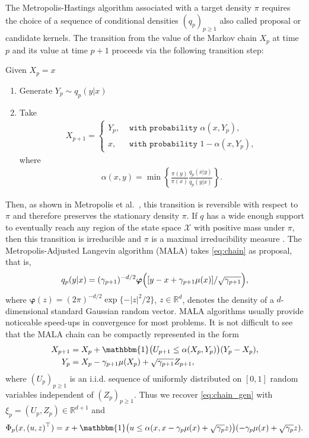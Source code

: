 \documentclass[article]{elsarticle}
\begin{document}
\begin{example}
The Metropolis-Hastings algorithm
associated with a target density \(\pi\) requires the choice of a sequence of conditional densities  \((q_p)_{p\geq 1}\) also called proposal or candidate kernels. The transition from the value  of the Markov chain \(X_p\)  at time \(p\)
and its value at time \(p + 1\) proceeds via the following transition step:

\begin{algorithm}[H]
Given \(X_p=x\)\;
\begin{enumerate}
\item Generate \(Y_p\sim q_p(y|x)\)\;
\item Take
\begin{eqnarray*}
X_{p+1}=
\begin{cases}
Y_p, & \texttt{ with probability } \alpha(x,Y_p),
\\
x, &  \texttt{ with probability } 1-\alpha(x,Y_p),
\end{cases}
\end{eqnarray*}
where
\begin{eqnarray*}
\alpha(x,y)=\min\left\{\frac{\pi(y)}{\pi(x)}\frac{q_p(x|y)}{q_p(y|x)}\right\}.
\end{eqnarray*}
\end{enumerate}
\end{algorithm}
Then, as shown in Metropolis et al.~\cite{metropolis1953equation}, this transition is reversible with respect to \(\pi\) and therefore preserves the stationary density \(\pi\). If \(q\) has a wide enough
support to eventually reach any region
of the state space \(\mathcal{X}\) with positive mass
under \(\pi\), then this transition is irreducible and $\pi$ is a maximal irreducibility measure \cite{mengersen:tweedie:1996}. The  Metropolis-Adjusted Langevin algorithm (MALA) takes  \eqref{eq:chain} as proposal, that is,
\begin{eqnarray*}
q_p(y|x)=(\gamma_{p+1})^{-d/2}\boldsymbol{\varphi}\Bigl([y-x+\gamma_{p+1}\mu(x)]/\sqrt{\gamma_{p+1}}\Bigr),
\end{eqnarray*}
where
$\boldsymbol{\varphi}(z)=(2\pi)^{-d/2} \exp\{-|z|^2/2\}$,
$z\in\mathbb R^d$, denotes the density of a $d$-dimensional
standard Gaussian random vector.  MALA algorithms usually provide noticeable speed-ups in convergence for most problems. It is not difficult to see that the MALA chain can be compactly represented in the form
\begin{align*}
X_{p+1} &=X_p+\mathbbm{1}\bigl(U_{p+1}\leq \alpha(X_{p},Y_{p})\bigr)(Y_{p}-X_p),  \\
Y_{p}&=X_p-\gamma_{p+1}\mu(X_p)+\sqrt{\gamma_{p+1}}Z_{p+1},
\end{align*}
where \((U_{p})_{p\geq 1}\) is an i.i.d. sequence of uniformly distributed on \([0,1]\) random variables independent of \((Z_p)_{p\geq 1}.\) Thus we recover \eqref{eq:chain_gen} with  \(\xi_p=(U_p,Z_p)\in \mathbb{R}^{d+1}\) and
\begin{eqnarray*}
\Phi_p(x,(u,z)^\top)=x+\mathbbm{1}\bigl(u\leq \alpha(x,x-\gamma_{p}\mu(x)+\sqrt{\gamma_{p}}z)\bigr)(-\gamma_{p}\mu(x)+\sqrt{\gamma_{p}}z).
\end{eqnarray*}
\end{example}
\end{document}
